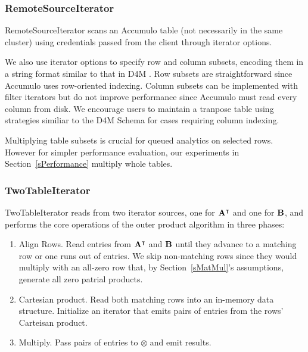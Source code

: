 \subsubsection{RemoteSourceIterator}
RemoteSourceIterator scans an Accumulo table
(not necessarily in the same cluster) %
using credentials passed from the client through iterator options.

We also use iterator options to specify row and column subsets, 
encoding them in a string format similar to that in D4M \cite{kepner2012dynamic}.
Row subsets are straightforward since Accumulo uses row-oriented indexing.
Column subsets can be implemented with filter iterators
but do not improve performance since Accumulo must read every column from disk.
We encourage users to maintain a tranpose table
using strategies similiar to the D4M Schema \cite{kepner2013d4m}
for cases requiring column indexing.

Multiplying table subsets is crucial for queued analytics on selected rows.
However for simpler performance evaluation, 
our experiments in Section~\ref{sPerformance} multiply whole tables.

\subsubsection{TwoTableIterator}
TwoTableIterator reads from two iterator sources, one for $\mathbf{A^{\intercal}}$ and one for $\mathbf{B}$,
and performs the core operations of the outer product algorithm in three phases:
\begin{enumerate}
\item Align Rows.  Read entries from $\mathbf{A^{\intercal}}$ and $\mathbf{B}$ until they advance to a matching row
or one runs out of entries. We skip non-matching rows 
since they would multiply with an all-zero row that, by Section~\ref{sMatMul}'s assumptions,
generate all zero patrial products.
\item Cartesian product. Read both matching rows into an in-memory data structure. 
Initialize an iterator that emits pairs of entries from the rows' Carteisan product.
\item Multiply. Pass pairs of entries to $\otimes$ and emit results. 
\end{enumerate}

